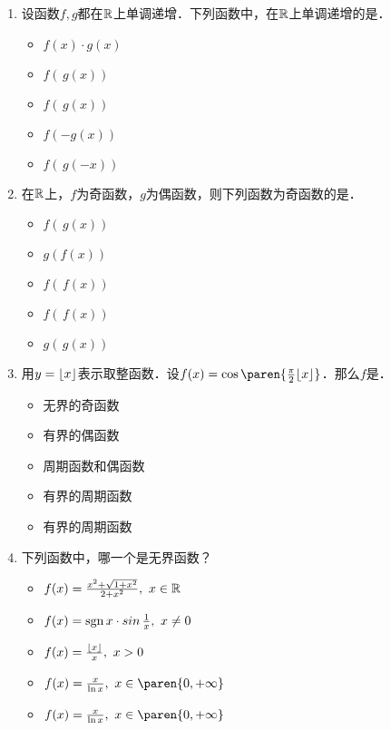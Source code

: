 \begin{enumerate}
\item 设函数\(f, g\)都在\(\mathbb{R}\)上单调递增．下列函数中，在\(\mathbb{R}\)上单调递增的是\uline{\makebox[3em]{}}．
  \begin{itemize}
    \renewcommand{\labelitemi}{\faCircleThin}
  \item \(f(x) \cdot g(x)\)
    \ifshowsol
    \item[\faCircle] \(f(\,g(x))\)
    \else
    \item \(f(\,g(x))\)
    \fi
  \item \(f(-g(x))\)
  \item \(f(\,g(-x))\)
  \end{itemize}

\item 在\(\mathbb{R}\)上，\(f\)为奇函数，\(g\)为偶函数，则下列函数为奇函数的是\uline{\makebox[3em]{}}．
  \begin{itemize}
    \renewcommand{\labelitemi}{\faCircleThin}
  \item \(f(\,g(x))\)
  \item \(g(f(x))\)
    \ifshowsol
    \item[\faCircle] \(f(\,f(x))\)
    \else
    \item \(f(\,f(x))\)
    \fi
  \item \(g(\,g(x))\)
  \end{itemize}

\item 用\(y = \lfloor x\rfloor\)表示取整函数．设\(f(x) = \cos\paren{\frac\pi2 \floor x}\)．那么\(f\)是\uline{\makebox[4em]{}}．
  \begin{itemize}
    \renewcommand{\labelitemi}{\faCircleThin}
  \item 无界的奇函数
  \item 有界的偶函数
  \item 周期函数和偶函数
    \ifshowsol
    \item[\faCircle] 有界的周期函数
    \else
    \item 有界的周期函数
    \fi
  \end{itemize}

\item 下列函数中，哪一个是无界函数？
  \begin{itemize}
    \renewcommand{\labelitemi}{\faCircleThin}
  \item \(f(x) = \frac{x^2 + \sqrt{1+x^2}}{2 + x^2},\ x \in \mathbb{R}\)
  \item \(f(x) = \operatorname{sgn} x \cdot \operatorname{\smash{sin}} \frac1x,\ x \ne 0\)
  \item \(f(x) = \frac{\lfloor x\rfloor}{x},\ x > 0\)
    \ifshowsol
    \item[\faCircle] \(f(x) = \frac{x}{\ln x},\ x \in \paren{0,+\infty}\)
    \else
    \item \(f(x) = \frac{x}{\ln x},\ x \in \paren{0,+\infty}\)
    \fi
  \end{itemize}


\end{enumerate}
